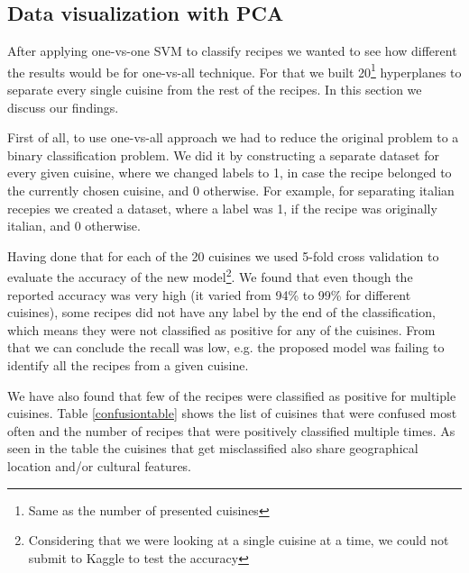 \documentclass[prodmode,acmtap]{acmlarge}
\begin{document}
\subsection{Data visualization with PCA}
After applying one-vs-one SVM to classify recipes we wanted to see how different the results would be for one-vs-all technique. For that we built 20\footnote{Same as the number of presented cuisines} hyperplanes to separate every single cuisine from the rest of the recipes. In this section we discuss our findings. 







First of all, to use one-vs-all approach we had to reduce the original problem to a binary classification problem. We did it by constructing a separate dataset for every given cuisine, where we changed labels to 1, in case the recipe belonged to the currently chosen cuisine, and 0 otherwise. For example, for separating italian recepies we created a dataset, where a label was 1, if the recipe was originally italian, and 0 otherwise. 


Having done that for each of the 20 cuisines we used 5-fold cross validation to evaluate the accuracy of the new model\footnote{Considering that we were looking at a single cuisine at a time, we could not submit to Kaggle to test the accuracy}. We found that even though the reported accuracy was very high (it varied from 94\% to 99\% for different cuisines), some recipes did not have any label by the end of the classification, which means they were not classified as positive for any of the cuisines. From that we can conclude the recall was low, e.g. the proposed model was failing to identify all the recipes from a given cuisine. 

We have also found that few of the recipes were classified as positive for multiple cuisines. Table \ref{confusiontable} shows the list of cuisines that were confused most often and the number of recipes that were positively classified multiple times. As seen in the table the cuisines that get misclassified also share geographical location and/or cultural features. 
\end{document}
